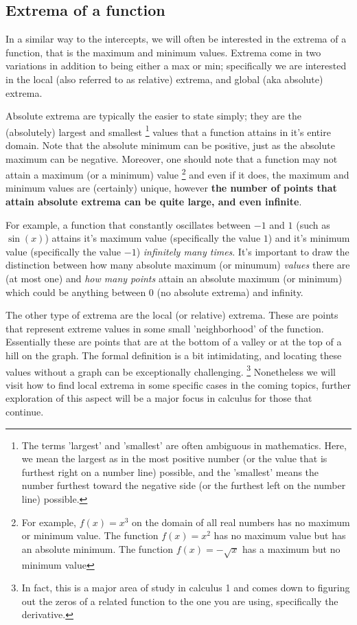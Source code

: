 \documentclass{ximeraXloud}
\begin{document}
\subsection*{Extrema of a function}

    In a similar way to the intercepts, we will often be interested in the extrema of a function, that is the maximum and minimum values. Extrema come in two variations in addition to being either a max or min; specifically we are interested in the local (also referred to as relative) extrema, and global (aka absolute) extrema.
    
    Absolute extrema are typically the easier to state simply; they are the (absolutely) largest and smallest%
    \footnote{%
        The terms 'largest' and 'smallest' are often ambiguous in mathematics. Here, we mean the largest as in the most positive number (or the value that is furthest right on a number line) possible, and the 'smallest' means the number furthest toward the negative side (or the furthest left on the number line) possible.%
        }
    values that a function attains in it's entire domain. Note that the absolute minimum can be positive, just as the absolute maximum can be negative. Moreover, one should note that a function may not attain a maximum (or a minimum) value%
    \footnote{%
        For example, $f(x) = x^3$ on the domain of all real numbers has no maximum or minimum value. The function $f(x) = x^2$ has no maximum value but has an absolute minimum. The function $f(x) = -\sqrt{x}$ has a maximum but no minimum value%
        }
    and even if it does, the maximum and minimum values are (certainly) unique, however \textbf{the number of points that attain absolute extrema can be quite large, and even infinite}. 
    
    For example, a function that constantly oscillates between $-1$ and $1$ (such as $\sin(x)$) attains it's maximum value (specifically the value $1$) and it's minimum value (specifically the value $-1$) \textit{infinitely many times}. It's important to draw the distinction between how many absolute maximum (or minumum) \textit{values} there are (at most one) and \textit{how many points} attain an absolute maximum (or minimum) which could be anything between 0 (no absolute extrema) and infinity.
    
    The other type of extrema are the local (or relative) extrema. These are points that represent extreme values in some small 'neighborhood' of the function. Essentially these are points that are at the bottom of a valley or at the top of a hill on the graph. The formal definition is a bit intimidating, and locating these values without a graph can be exceptionally challenging.%
    \footnote{%
        In fact, this is a major area of study in calculus 1 and comes down to figuring out the zeros of a related function to the one you are using, specifically the derivative.%
        }
    Nonetheless we will visit how to find local extrema in some specific cases in the coming topics, further exploration of this aspect will be a major focus in calculus for those that continue.
    
\end{document}
